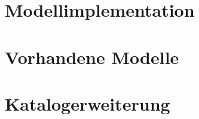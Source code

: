 \section{Modellimplementation}
\label{Ch:Ergebnisse:Sec:Implementation}

\section{Vorhandene Modelle}
\label{Ch:Ergebnisse:Sec:Modelle}

\section{Katalogerweiterung}
\label{Ch:Ergebnisse:Sec:Erweiterung}



